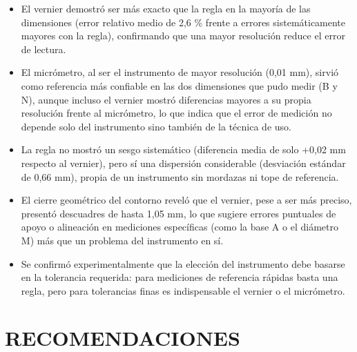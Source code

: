 \documentclass[12pt,a4paper]{article}
\begin{document}
\begin{itemize}
	\item El vernier demostró ser más exacto que la regla en la mayoría de las
	      dimensiones (error relativo medio de 2,6 \% frente a errores
	      sistemáticamente mayores con la regla), confirmando que una mayor
	      resolución reduce el error de lectura.\\[-10pt]
	\item El micrómetro, al ser el instrumento de mayor resolución (0,01 mm),
	      sirvió como referencia más confiable en las dos dimensiones que pudo
	      medir (B y N), aunque incluso el vernier mostró diferencias mayores a su
	      propia resolución frente al micrómetro, lo que indica que el error de
	      medición no depende solo del instrumento sino también de la técnica de
	      uso.\\[-10pt]
	\item La regla no mostró un sesgo sistemático (diferencia media de solo +0,02
	      mm respecto al vernier), pero sí una dispersión considerable (desviación
	      estándar de 0,66 mm), propia de un instrumento sin mordazas ni tope de
	      referencia.\\[-10pt]
	\item El cierre geométrico del contorno reveló que el vernier, pese a ser más
	      preciso, presentó descuadres de hasta 1,05 mm, lo que sugiere errores
	      puntuales de apoyo o alineación en mediciones específicas (como la base
	      A o el diámetro M) más que un problema del instrumento en sí.\\[-10pt]
	\item Se confirmó experimentalmente que la elección del instrumento debe
	      basarse en la tolerancia requerida: para mediciones de referencia
	      rápidas basta una regla, pero para tolerancias finas es indispensable el
	      vernier o el micrómetro.
\end{itemize}

\section{RECOMENDACIONES}
\end{document}

